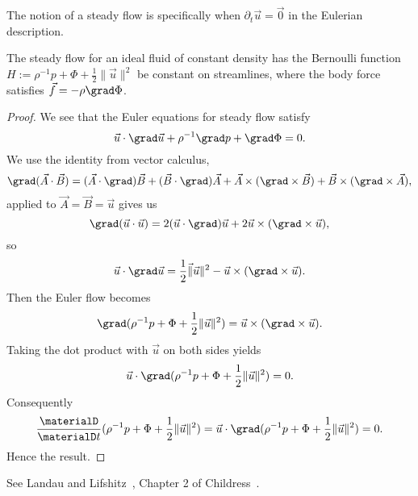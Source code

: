 \begin{node}[Hydrostatics]
\begin{node}\label{fluids:euler-flow-000D}%
The notion of a steady flow is specifically when
$\partial_{t}\vec{u}=\vec{0}$ in the Eulerian description.

\begin{theorem}[Bernoulli]\label{fluids:euler-flow-000E}%
The steady flow for an ideal fluid of constant density has the Bernoulli
function $H:=\rho^{-1}p+\Phi+\frac{1}{2}\|\vec{u}\|^{2}$ be constant on
streamlines, where the body force satisfies $\vec{f}=-\rho\grad\Phi$.
\end{theorem}

\begin{proof}
We see that the Euler equations for steady flow satisfy
\begin{equation*}
\vec{u}\cdot\grad\vec{u}+\rho^{-1}\grad p+\grad\Phi=0.
\end{equation*}
We use the identity from vector calculus,
\begin{equation*}
\grad(\vec{A}\cdot\vec{B})=(\vec{A}\cdot\grad)\vec{B}+(\vec{B}\cdot\grad)\vec{A}+\vec{A}\times(\grad\times\vec{B})+\vec{B}\times(\grad\times\vec{A}),
\end{equation*}
applied to $\vec{A}=\vec{B}=\vec{u}$ gives us
\begin{equation*}
\grad(\vec{u}\cdot\vec{u})=2(\vec{u}\cdot\grad)\vec{u}+2\vec{u}\times(\grad\times\vec{u}),
\end{equation*}
so
\begin{equation*}
\vec{u}\cdot\grad\vec{u}=\frac{1}{2}\vec\|\vec{u}\|^{2}-\vec{u}\times(\grad\times\vec{u}).
\end{equation*}
Then the Euler flow becomes
\begin{equation}
\grad(\rho^{-1}p+\Phi+\frac{1}{2}\|\vec{u}\|^{2})=\vec{u}\times(\grad\times\vec{u}).
\end{equation}
Taking the dot product with $\vec{u}$ on both sides yields
\begin{equation}
\vec{u}\cdot\grad(\rho^{-1}p+\Phi+\frac{1}{2}\|\vec{u}\|^{2})=0.
\end{equation}
Consequently
\begin{equation}
\frac{\materialD}{\materialD t}(\rho^{-1}p+\Phi+\frac{1}{2}\|\vec{u}\|^{2})
=\vec{u}\cdot\grad(\rho^{-1}p+\Phi+\frac{1}{2}\|\vec{u}\|^{2})
=0.
\end{equation}
Hence the result.
\end{proof}
\end{node}

\begin{node}[References]\label{fluids:euler-flow-000A}%
See Landau and Lifshitz~\cite[\S3]{landau1987fluids}, Chapter 2 of
Childress~\cite{childress2009introduction}. 
\end{node}
\end{node}
